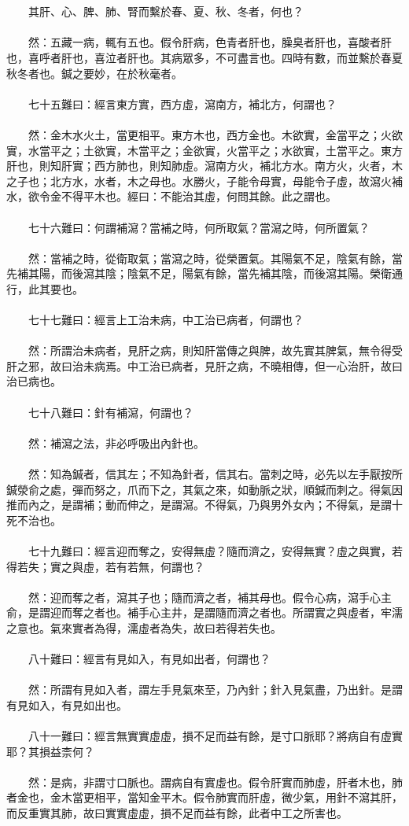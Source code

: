 \\\\
　　其肝、心、脾、肺、腎而繫於春、夏、秋、冬者，何也？
\\\\
　　然：五藏一病，輒有五也。假令肝病，色青者肝也，臊臭者肝也，喜酸者肝也，喜呼者肝也，喜泣者肝也。其病眾多，不可盡言也。四時有數，而並繫於春夏秋冬者也。鍼之要妙，在於秋毫者。
\\\\
　　七十五難曰：經言東方實，西方虛，瀉南方，補北方，何謂也？
\\\\
　　然：金木水火土，當更相平。東方木也，西方金也。木欲實，金當平之；火欲實，水當平之；土欲實，木當平之；金欲實，火當平之；水欲實，土當平之。東方肝也，則知肝實；西方肺也，則知肺虛。瀉南方火，補北方水。南方火，火者，木之子也；北方水，水者，木之母也。水勝火，子能令母實，母能令子虛，故瀉火補水，欲令金不得平木也。經曰：不能治其虛，何問其餘。此之謂也。
\\\\
　　七十六難曰：何謂補瀉？當補之時，何所取氣？當瀉之時，何所置氣？
\\\\
　　然：當補之時，從衛取氣；當瀉之時，從榮置氣。其陽氣不足，陰氣有餘，當先補其陽，而後瀉其陰；陰氣不足，陽氣有餘，當先補其陰，而後瀉其陽。榮衛通行，此其要也。
\\\\
　　七十七難曰：經言上工治未病，中工治已病者，何謂也？
\\\\
　　然：所謂治未病者，見肝之病，則知肝當傳之與脾，故先實其脾氣，無令得受肝之邪，故曰治未病焉。中工治已病者，見肝之病，不曉相傳，但一心治肝，故曰治已病也。
\\\\
　　七十八難曰：針有補瀉，何謂也？
\\\\
　　然：補瀉之法，非必呼吸出內針也。
\\\\
　　然：知為鍼者，信其左；不知為針者，信其右。當刺之時，必先以左手厭按所鍼滎俞之處，彈而努之，爪而下之，其氣之來，如動脈之狀，順鍼而刺之。得氣因推而內之，是謂補；動而伸之，是謂瀉。不得氣，乃與男外女內；不得氣，是謂十死不治也。
\\\\
　　七十九難曰：經言迎而奪之，安得無虛？隨而濟之，安得無實？虛之與實，若得若失；實之與虛，若有若無，何謂也？
\\\\
　　然：迎而奪之者，瀉其子也；隨而濟之者，補其母也。假令心病，瀉手心主俞，是謂迎而奪之者也。補手心主井，是謂隨而濟之者也。所謂實之與虛者，牢濡之意也。氣來實者為得，濡虛者為失，故曰若得若失也。
\\\\
　　八十難曰：經言有見如入，有見如出者，何謂也？
\\\\
　　然：所謂有見如入者，謂左手見氣來至，乃內針；針入見氣盡，乃出針。是謂有見如入，有見如出也。
\\\\
　　八十一難曰：經言無實實虛虛，損不足而益有餘，是寸口脈耶？將病自有虛實耶？其損益柰何？
\\\\
　　然：是病，非謂寸口脈也。謂病自有實虛也。假令肝實而肺虛，肝者木也，肺者金也，金木當更相平，當知金平木。假令肺實而肝虛，微少氣，用針不瀉其肝，而反重實其肺，故曰實實虛虛，損不足而益有餘，此者中工之所害也。